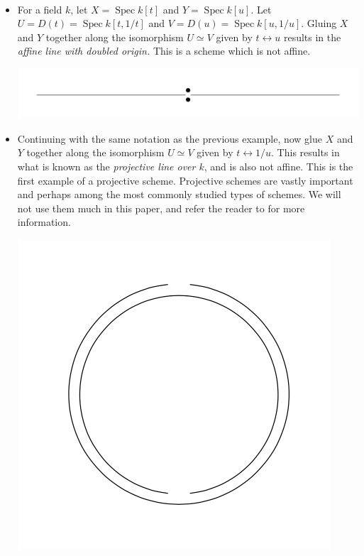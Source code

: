 \documentclass[11pt,openany]{book} %
\newcommand{\spc}{\operatorname{Spec}}
\begin{document}
\begin{example}\
\begin{itemize}
	\item For a field $k$, let $X = \spc k[t]$ and $Y = \spc k[u]$. Let $U = D(t) = \spc k[t,1/t]$ and $V = D(u) = \spc k[u,1/u]$. Gluing $X$ and $Y$ together along the isomorphism $U \simeq V$ given by $t \leftrightarrow u$ results in the \emph{affine line with doubled origin.} This is a scheme which is not affine.\\
    \begin{center}
    \includegraphics[scale=0.5]{afflinedouble}
    \end{center}
    
    \item Continuing with the same notation as the previous example, now glue $X$ and $Y$ together along the isomorphism $U \simeq V$ given by $t \leftrightarrow 1/u$. This results in what is known as the \emph{projective line over $k$}, and is also not affine. This is the first example of a projective scheme. Projective schemes are vastly important and perhaps among the most commonly studied types of schemes. We will not use them much in this paper, and refer the reader to \cite{vakil} for more information.\\
    \begin{center}
    \includegraphics[scale=0.5]{projline}
    \end{center}
\end{itemize}
\end{example}
\end{document}

